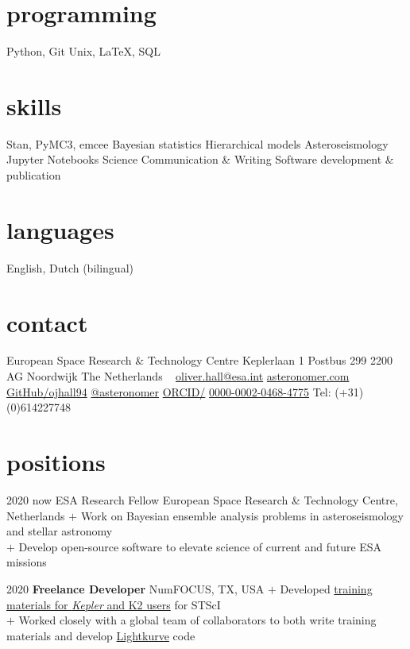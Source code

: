 \documentclass[letterpaper]{k-cv} %
\begin{document}


\begin{aside} %
\section{\color{c1}programming}
\bodyfont Python, Git
Unix, LaTeX,
SQL
\section{\color{c1}skills}
Stan, PyMC3, emcee 
Bayesian statistics
Hierarchical models
Asteroseismology
Jupyter Notebooks
Science Communication \& Writing
Software development \& publication
\section{\color{c1}languages}
English, Dutch (bilingual)
\section{\color{c1}contact}
European Space Research \& Technology Centre
Keplerlaan 1
Postbus 299
2200 AG Noordwijk
The Netherlands
~
\href{mailto:oliver.hall@esa.int}{oliver.hall@esa.int}
\href{www.asteronomer.com}{asteronomer.com}
\href{http://www.github.com/ojhall94}{GitHub/ojhall94}
\href{http://www.twitter.com/asteronomer}{@asteronomer}
\href{http://www.orcid.com/0000-0002-0468-4775}{ORCID/}
\href{http://www.orcid.com/0000-0002-0468-4775}{0000-0002-0468-4775}
Tel: (+31)(0)614227748
\end{aside}

\section{\color{c1}positions}
\begin{entrylist}
	\entry
	{2020 \to now}
	{ESA Research Fellow}
	{European Space Research \& Technology Centre, Netherlands}
	{$+$ Work on Bayesian ensemble analysis problems in asteroseismology and stellar astronomy\\
		$+$ Develop open-source software to elevate science of current and future ESA missions}
	
	\entry
	{2020}
	{\textbf{Freelance Developer}}
	{NumFOCUS, TX, USA}
	{$+$ Developed \href{https://github.com/spacetelescope/notebooks/blob/master/notebooks/MAST/Kepler/README.md}{training materials for \emph{Kepler} and K2 users} for STScI\\
		$+$ Worked closely with a global team of collaborators to both write training materials and develop \href{https://github.com/lightkurve/lightkurve}{Lightkurve} code}
\end{entrylist}
\end{document}
